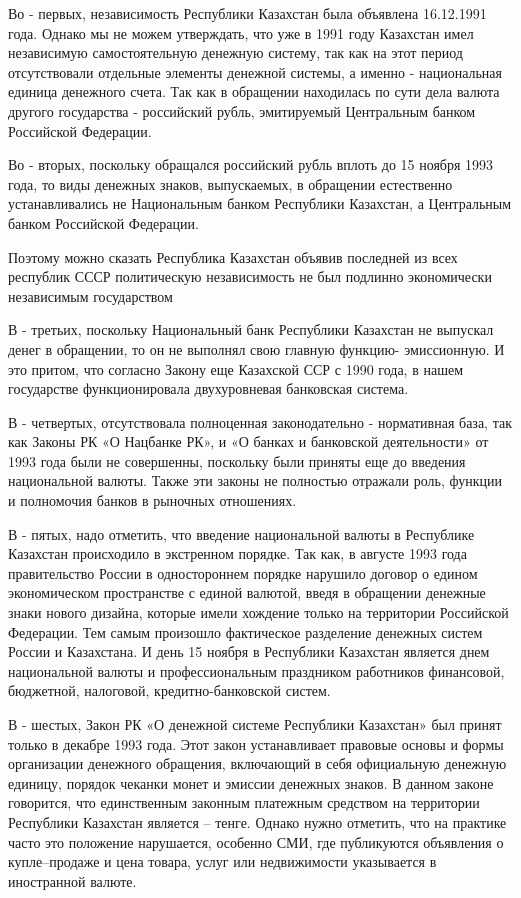 Во - первых, независимость Республики Казахстан была объявлена
16.12.1991 года. Однако мы не можем утверждать, что уже в 1991 году
Казахстан имел независимую самостоятельную денежную систему, так как на
этот период отсутствовали отдельные элементы денежной системы, а именно
- национальная единица денежного счета. Так как в обращении находилась
по сути дела валюта другого государства - российский рубль, эмитируемый
Центральным банком Российской Федерации.

Во - вторых, поскольку обращался российский рубль вплоть до 15 ноября
1993 года, то виды денежных знаков, выпускаемых, в обращении естественно
устанавливались не Национальным банком Республики Казахстан, а
Центральным банком Российской Федерации.

Поэтому можно сказать Республика Казахстан объявив последней из всех
республик СССР политическую независимость не был подлинно экономически
независимым государством

В - третьих, поскольку Национальный банк Республики Казахстан не
выпускал денег в обращении, то он не выполнял свою главную функцию-
эмиссионную. И это притом, что согласно Закону еще Казахской ССР с 1990
года, в нашем государстве функционировала двухуровневая банковская
система.

В - четвертых, отсутствовала полноценная законодательно - нормативная
база, так как Законы РК «О Нацбанке РК», и «О банках и банковской
деятельности» от 1993 года были не совершенны, поскольку были приняты
еще до введения национальной валюты. Также эти законы не полностью
отражали роль, функции и полномочия банков в рыночных отношениях.

В - пятых, надо отметить, что введение национальной валюты в Республике
Казахстан происходило в экстренном порядке. Так как, в августе 1993 года
правительство России в одностороннем порядке нарушило договор о едином
экономическом пространстве с единой валютой, введя в обращении денежные
знаки нового дизайна, которые имели хождение только на территории
Российской Федерации. Тем самым произошло фактическое разделение
денежных систем России и Казахстана. И день 15 ноября в Республики
Казахстан является днем национальной валюты и профессиональным
праздником работников финансовой, бюджетной, налоговой,
кредитно-банковской систем.

В - шестых, Закон РК «О денежной системе Республики Казахстан» был
принят только в декабре 1993 года. Этот закон устанавливает правовые
основы и формы организации денежного обращения, включающий в себя
официальную денежную единицу, порядок чеканки монет и эмиссии денежных
знаков. В данном законе говорится, что единственным законным платежным
средством на территории Республики Казахстан является -- тенге. Однако
нужно отметить, что на практике часто это положение нарушается, особенно
СМИ, где публикуются объявления о купле--продаже и цена товара, услуг
или недвижимости указывается в иностранной валюте.

